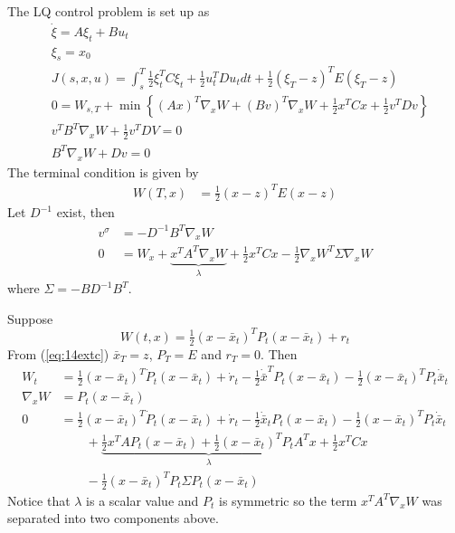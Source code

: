 \begin{example}
\label{ex:14lq}
The LQ control problem is set up as
\begin{align*}
&\dot{\xi} = A\xi_t+Bu_t \\
&\xi_s = x_0 \\
&J(s,x,u) = \int_s^T \tfrac{1}{2}\xi_t^T C\xi_t + \tfrac{1}{2}u_t^T Du_t dt + \tfrac{1}{2}{(\xi_T-z)}^T E(\xi_T-z) \\
&0 = W_{s,T} + \min\left\lbrace {(Ax)}^T\nabla_x W + {(Bv)}^T \nabla_x W + \tfrac{1}{2}x^T Cx + \tfrac{1}{2}v^T Dv \right\rbrace \\
&v^T B^T \nabla_x W + \frac{1}{2}v^T DV = 0 \\
&B^T \nabla_x W + Dv = 0
\end{align*}
The terminal condition is given by
\begin{align}
\label{eq:14extc}
W(T,x) &= \tfrac{1}{2}{(x-z)}^T E(x-z)
\end{align}
Let $D^{-1}$ exist, then
\begin{align*}
v^\sigma &= -D^{-1}B^T \nabla_x W \\
0 &= W_x+\underbrace{x^T A^T \nabla_x W}_{\lambda} + \tfrac{1}{2}x^T Cx - \tfrac{1}{2}\nabla_x W^T \Sigma\nabla_x W
\end{align*}
where $\Sigma = -BD^{-1}B^T$.

Suppose
$$W(t,x) = \tfrac{1}{2}{(x-\bar{x}_t)}^T P_t(x-\bar{x}_t) + r_t$$
From (\ref{eq:14extc}) $\bar{x}_T = z$, $P_T=E$ and $r_T=0$.
Then
\begin{align*}
W_t &= \tfrac{1}{2}{(x-\bar{x}_t)}^T\dot{P}_t(x-\bar{x}_t)+\dot{r}_t - \tfrac{1}{2}\dot{\bar{x}}^T P_t(x-\bar{x}_t) - \tfrac{1}{2}{(x-\bar{x}_t)}^T P_t\dot{\bar{x}}_t \\
\nabla_x W &= P_t(x-\bar{x}_t) \\
0 &= \tfrac{1}{2}{(x-\bar{x}_t)}^T\dot{P}_t(x-\bar{x}_t) + \dot{r}_t - \tfrac{1}{2}\dot{\bar{x}}_t P_t(x-\bar{x}_t) - \tfrac{1}{2}{(x-\bar{x}_t)}^T P_t\dot{\bar{x}}_t \\
&\qquad + \underbrace{\tfrac{1}{2}x^T AP_t(x-\bar{x}_t) + \tfrac{1}{2}{(x-\bar{x}_t)}^T P_t A^T x}_{\lambda} + \tfrac{1}{2}x^T Cx \\
&\qquad - \tfrac{1}{2}{(x-\bar{x}_t)}^T P_t \Sigma P_t(x-\bar{x}_t)
\end{align*}
Notice that $\lambda$ is a scalar value and $P_t$ is symmetric so the term $x^T A^T \nabla_x W$ was separated into two components above.


\end{example}

